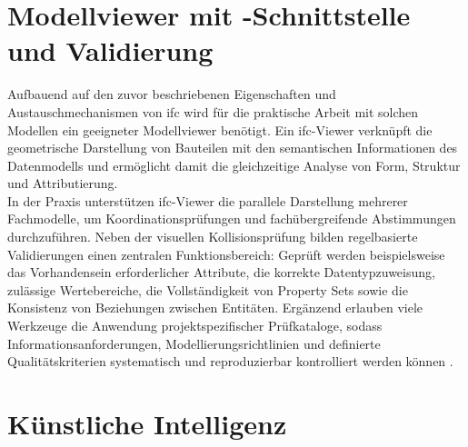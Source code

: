 \section{Modellviewer mit -Schnittstelle und Validierung}
\label{sec:ifc-viewer}

Aufbauend auf den zuvor beschriebenen Eigenschaften und Austauschmechanismen von \gls{ifc} wird für die praktische Arbeit mit solchen Modellen ein geeigneter Modellviewer benötigt.
Ein \gls{ifc}-Viewer verknüpft die geometrische Darstellung von Bauteilen mit den semantischen Informationen des Datenmodells und ermöglicht damit die gleichzeitige Analyse von Form, Struktur und Attributierung. \\

In der Praxis unterstützen \gls{ifc}-Viewer die parallele Darstellung mehrerer Fachmodelle, um Koordinationsprüfungen und fachübergreifende Abstimmungen durchzuführen.
Neben der visuellen Kollisionsprüfung bilden regelbasierte Validierungen einen zentralen Funktionsbereich: Geprüft werden beispielsweise das Vorhandensein erforderlicher Attribute, die korrekte Datentypzuweisung, zulässige Wertebereiche, die Vollständigkeit von Property Sets sowie die Konsistenz von Beziehungen zwischen Entitäten.
Ergänzend erlauben viele Werkzeuge die Anwendung projektspezifischer Prüfkataloge, sodass Informationsanforderungen, Modellierungsrichtlinien und definierte Qualitätskriterien systematisch und reproduzierbar kontrolliert werden können \cite{bimcollabUnknownZoom}.

\section{Künstliche Intelligenz}
\label{sec:ai}

